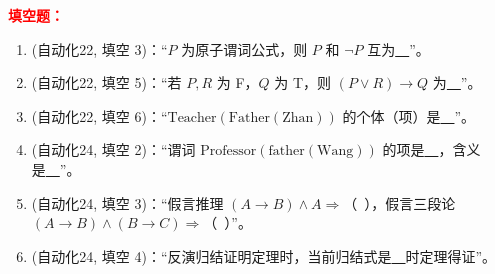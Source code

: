 ﻿\documentclass[../main.tex]{subfiles}
\begin{document}
\noindent\textbf{\textcolor{red}{填空题：}}
\begin{enumerate}[itemsep=0.3em, topsep=0.2em, leftmargin=1.5em]
    \item \textcolor{autoclassgreen}{(自动化22, 填空 3)}：``$P$ 为原子谓词公式，则 $P$ 和 $\lnot P$ 互为\underline{\ \ }''。 
    \item \textcolor{autoclassgreen}{(自动化22, 填空 5)}：``若 $P,R$ 为 F，$Q$ 为 T，则 $(P\lor R)\to Q$ 为\underline{\ \ }''。 
    \item \textcolor{autoclassgreen}{(自动化22, 填空 6)}：``$\mathrm{Teacher}(\mathrm{Father}(\mathrm{Zhan}))$ 的个体（项）是\underline{\ \ }''。 
    \item \textcolor{autoclassgreen}{(自动化24, 填空 2)}：``谓词 $\mathrm{Professor}(\mathrm{father}(\mathrm{Wang}))$ 的项是\underline{\ \ }，含义是\underline{\ \ }''。 
    \item \textcolor{autoclassgreen}{(自动化24, 填空 3)}：``假言推理 $(A\to B)\land A\Rightarrow$（\ ），假言三段论 $(A\to B)\land(B\to C)\Rightarrow$（\ ）''。 
    \item \textcolor{autoclassgreen}{(自动化24, 填空 4)}：``反演归结证明定理时，当前归结式是\underline{\ \ }时定理得证''。 
\end{enumerate}
\end{document}
